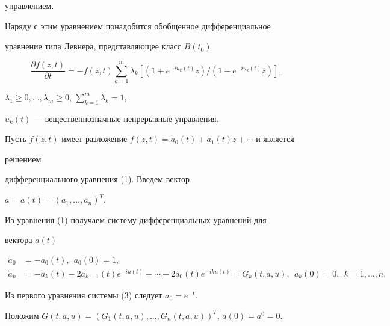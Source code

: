 управлением. 


 


Наряду с этим уравнением понадобится обобщенное дифференциальное 


уравнение типа Левнера, представляющее класс $B(t_0)$ 


\begin{equation} 


\frac{\partial f(z,t)}{\partial t}=-f(z,t) 


\sum^m_{k=1}\lambda_k[(1+e^{-i u_k(t)}z)/ 


(1-e^{-i u_k(t)}z)], 


\end{equation} 


$\lambda_1\ge0,\dotsc,\lambda_m\ge0$, $\sum\limits^m_{k=1}\lambda_k=1$, 


$u_k(t)$ --- вещественнозначные непрерывные управления. 


 


Пусть $f(z,t)$ имеет разложение $f(z,t)=a_0(t)+a_1(t)z+\dotsb$ и является 


решением 


дифференциального уравнения (1). Введем вектор 


$a=a(t)=(a_1,\dotsc,a_n)^T$. 


Из уравнения (1) получаем систему дифференциальных уравнений для 


вектора $a(t)$ 


\begin{equation} 


\begin{split} 


\Dot a_0&=-a_0(t),\ \ a_0(0)=1, \\ 


\Dot a_k&=-a_k(t)-2a_{k-1}(t)e^{-i u(t)}-\dotsb- 


2a_0(t)e^{-i k u(t)}=G_k(t,a,u), 


\ \ a_k(0)=0,\ \ k=1,\dotsc,n. 


\end{split} 


\end{equation} 


Из первого уравнения системы (3) следует $a_0{=}e^{-t}$. 


Положим $G(t,a,u){=}(G_1(t,a,u),...,G_n(t,a,u))^T$, $a(0)=a^0=0$. 




